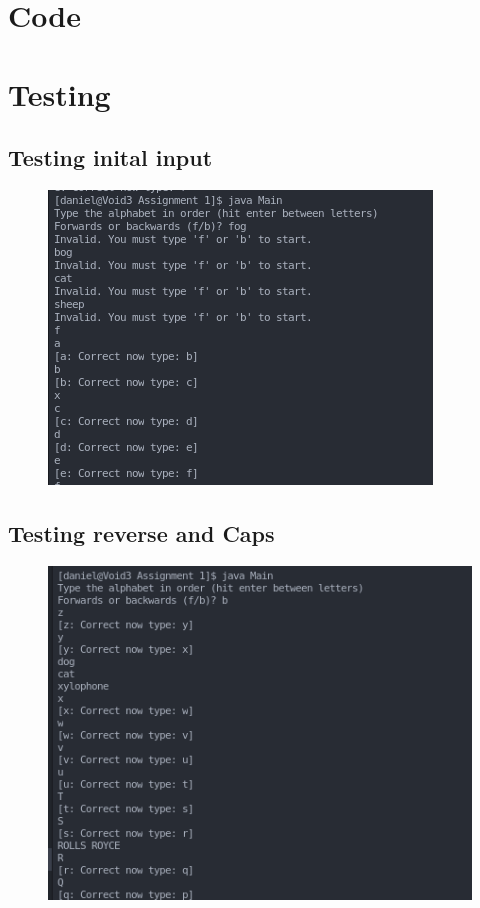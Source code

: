\documentclass{article}
\begin{document}
	\section{Code}
	\newpage
	\section{Testing}
	\subsection{Testing inital input}
	\begin{figure}[!h]
		\centering
		\includegraphics[width=\textwidth]{1.png}
	\end{figure}
	\newpage
	\subsection{Testing reverse and Caps}
		\begin{figure}[!h]
			\centering
			\includegraphics[width=\textwidth]{2.png}
		\end{figure}
		\newpage
\end{document}
